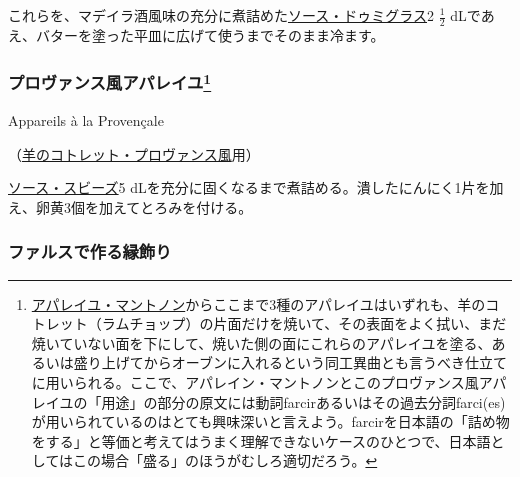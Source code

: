 \begin{recette}
これらを、マデイラ酒風味の充分に煮詰めた\protect\hyperlink{sauce-demi-glace}{ソース・ドゥミグラス}2
\(\frac{1}{2}\)
dLであえ、バターを塗った平皿に広げて使うまでそのまま冷ます。

\atoaki{}

\hypertarget{appareil-provencal}{%
\subsubsection[プロヴァンス風アパレイユ]{\texorpdfstring{プロヴァンス風アパレイユ\footnote{\protect\hyperlink{appareil-maintenon}{アパレイユ・マントノン}からここまで3種のアパレイユはいずれも、羊のコトレット（ラムチョップ）の片面だけを焼いて、その表面をよく拭い、まだ焼いていない面を下にして、焼いた側の面にこれらのアパレイユを塗る、あるいは盛り上げてからオーブンに入れるという同工異曲とも言うべき仕立てに用いられる。ここで、アパレイン・マントノンとこのプロヴァンス風アパレイユの「用途」の部分の原文には動詞farcirあるいはその過去分詞farci(es)が用いられているのはとても興味深いと言えよう。farcirを日本語の「詰め物をする」と等価と考えてはうまく理解できないケースのひとつで、日本語としてはこの場合「盛る」のほうがむしろ適切だろう。}}{プロヴァンス風アパレイユ}}\label{appareil-provencal}}

\begin{frsubenv}

Appareils à la Provençale

\end{frsubenv}


（\protect\hyperlink{cotelettes-provencale}{羊のコトレット・プロヴァンス風}用）

\protect\hyperlink{sauce-soubise}{ソース・スビーズ}5
dLを充分に固くなるまで煮詰める。潰したにんにく1片を加え、卵黄3個を加えてとろみを付ける。

\atoaki{}

\hypertarget{bordures-en-farce}{%
\subsubsection{ファルスで作る縁飾り}\label{bordures-en-farce}}

\begin{frsubenv}


\end{frsubenv}
\end{recette}
